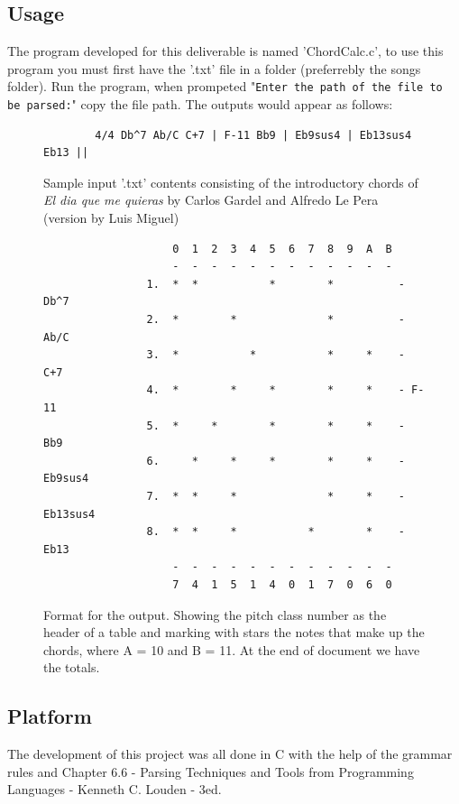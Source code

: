 \documentclass{article}
\begin{document}
\subsection{Usage}
The program developed for this deliverable is named 'ChordCalc.c', to use this program you must first have the '.txt' file in a folder (preferrebly the songs folder). Run the program, when prompeted "\texttt{Enter the path of the file to be parsed:}" copy the file path. The outputs would appear as follows:
\begin{figure}[H]
    \begin{lstlisting}
        4/4 Db^7 Ab/C C+7 | F-11 Bb9 | Eb9sus4 | Eb13sus4 Eb13 ||  
    \end{lstlisting}
    \caption{Sample input '.txt' contents consisting of the introductory chords of \textit{El dia que me quieras} by Carlos Gardel and Alfredo Le Pera (version by Luis Miguel)}
    \label{fig:SampleInput}
\end{figure}
\begin{figure}[H]
    \begin{lstlisting}
                    0  1  2  3  4  5  6  7  8  9  A  B
                    -  -  -  -  -  -  -  -  -  -  -  -
                1.  *  *           *        *          - Db^7
                2.  *        *              *          - Ab/C
                3.  *           *           *     *    - C+7
                4.  *        *     *        *     *    - F-11
                5.  *     *        *        *     *    - Bb9
                6.     *     *     *        *     *    - Eb9sus4
                7.  *  *     *              *     *    - Eb13sus4
                8.  *  *     *           *        *    - Eb13
                    -  -  -  -  -  -  -  -  -  -  -  - 
                    7  4  1  5  1  4  0  1  7  0  6  0
    \end{lstlisting}
    \caption{Format for the output. Showing the pitch class number as the header of a table and marking with stars the notes that make up the chords, where A = 10 and B = 11. At the end of document we have the totals.}
    \label{fig:SampleOutput}
\end{figure}
\subsection{Platform}
The development of this project was all done in C with the help of the grammar rules and Chapter 6.6 - Parsing Techniques and Tools from Programming Languages - Kenneth C. Louden - 3ed.
\end{document}
